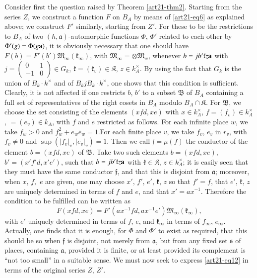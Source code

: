 Consider first the question raised by Theorem \ref{art21-thm2}. Starting from the series $Z$, we construct a function $F$ on $B_{A}$ by means of \eqref{art21-eq6} as explained above; we construct $F'$ similarly, starting from $Z'$. For these to be the restrictions to $B_{A}$ of two $(h,\mathfrak{a})$-automorphic functions $\Phi$, $\Phi'$ related to each other by $\Phi'(g)=\Phi(g\mathbf{a})$, it is obviously necessary that one should have $F(b)=F'(b')\mathfrak{M}_{\infty}(\mathfrak{k}_{\infty})$, with $\mathfrak{M}_{\infty}=\otimes \mathfrak{M}_{w}$, whenever $b=jb'\mathfrak{k}z\mathbf{a}$ with $j=\left(\begin{smallmatrix} 0 & 1\\ -1 & 0\end{smallmatrix}\right)\in G_{k}$, $\mathfrak{k}=(\mathfrak{k}_{v})\in \mathfrak{K}$, $z\in k^{\times}_{A}$. By using the fact that $G_{k}$ is the union of $B_{k}\cdot k^{\times}$ and of $B_{k}jB_{k}\cdot k^{\times}$, one shows that this condition is sufficient. Clearly, it is not affected if one restricts $b$, $b'$ to a subset $\mathfrak{B}$ of $B_{A}$ containing a full set of representatives of the right cosets in $B_{A}$ modulo $B_{A}\cap \mathfrak{K}$. For $\mathfrak{B}$, we choose the set consisting of the elements $(xfd,xe)$ with $x\in k^{\times}_{A}$, $f=(f_{v})\in k^{\times}_{A}$, $=(e_{v})\in k_{A}$, with $f$ and $e$ restricted as follows. For each infinite place $w$, we take $f_{w}>0$ and $f^{2}_{w}+e_{w}\overline{e}_{w}=1$.\pageoriginale For each finite place $v$, we take $f_{v}$, $e_{v}$ in $r_{v}$, with $f_{v}\neq 0$ and $\sup (|f_{v}|_{v},|e_{v}|_{v})=1$. Then we call $\mathfrak{f}=\mu(f)$ the conductor of the element $b=(xfd,xe)$ of $\mathfrak{B}$. Take two such elements $b=(xfd,xe)$, $b'=(x'f'd,x'e')$, such that $b=jb'\mathfrak{k}z\mathbf{a}$ with $\mathfrak{k}\in \mathfrak{K}$, $z\in k^{\times}_{A}$; it is easily seen that they must have the same conductor $\mathfrak{f}$, and that this is disjoint from $\mathfrak{a}$; moreover, when $x$, $f,$ $e$ are given, one may choose $x'$, $f'$, $e'$, $\mathfrak{k}$, $z$ so that $f'=f$, that $e'$, $\mathfrak{k}$, $z$ are uniquely determined in terms of $f$ and $e$, and that $x'=ax^{-1}$. Therefore the condition to be fulfilled can be written as
\begin{equation*}
F(xfd,xe)=F'(ax^{-1}fd, ax^{-1}e')\mathfrak{M}_{\infty}(\mathfrak{k}_{\infty}),\label{art21-eq12}
\end{equation*}
with $e'$ uniquely determined in terms of $f$, $e$, and $\mathfrak{k}_{\infty}$ in terms of $f_{\infty}$, $e_{\infty}$. Actually, one finds that it is enough, for $\Phi$ and $\Phi'$ to exist as required, that this should be so when $\mathfrak{f}$ is disjoint, not merely from $\mathfrak{a}$, but from any fixed set $\mathfrak{s}$ of places, containing $\mathfrak{a}$, provided it is finite, or at least provided its complement is ``not too small'' in a suitable sense. We must now seek to express \eqref{art21-eq12} in terms of the original series $Z$, $Z'$.

